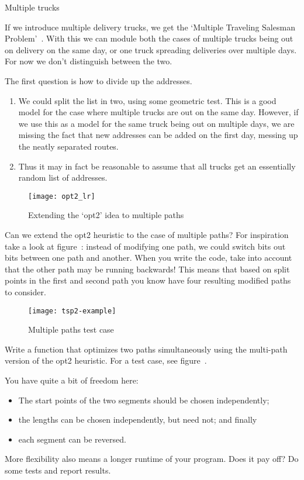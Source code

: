  {Multiple trucks}
\label{sec:amazon-days}

If we introduce multiple delivery trucks, we get the `Multiple
Traveling Salesman Problem'~\cite{Bektas:MTSP}.
With this we can module both the cases of multiple trucks being out on
delivery on the same day, or one truck spreading deliveries over
multiple days. For now we don't distinguish between the two.

The first question is how to divide up the addresses.
\begin{enumerate}
\item We could split the list in two, using some geometric test. This
  is a good model for the case where multiple trucks are out on the
  same day. However, if we use this as a model for the same truck
  being out on multiple days, we are missing the fact that new
  addresses can be added on the first day, messing up the neatly
  separated routes.
\item Thus it may in fact be reasonable to assume that all trucks get
  an essentially random list of addresses.
\end{enumerate}

\begin{figure}[ht]
  \texttt{[image: opt2\_lr]}
  \caption{Extending the `opt2' idea to multiple paths}
  \label{fig:opt2_lr}
\end{figure}

Can we extend the opt2 heuristic to the case of multiple paths?
For inspiration take a look at figure~: instead of
modifying one path, we could switch bits out bits between one path and another.
When you write the code, take into account that the other path may be
running backwards! This means that based on split points in the first
and second path you know have four resulting modified paths to
consider.

\begin{figure}[ht]
  \texttt{[image: tsp2-example]}
  \caption{Multiple paths test case}
  \label{fig:tsp2-example}
\end{figure}

\begin{exercise}
  Write a function that optimizes two paths simultaneously using the
  multi-path version of the opt2 heuristic. For a test case, see
  figure~.

  You have quite a bit of freedom here:
  \begin{itemize}
  \item The start points of the two segments should be chosen independently;
  \item the lengths can be chosen independently, but need not; and finally
  \item each segment can be reversed.
  \end{itemize}
  More flexibility also means a longer runtime of your program.
  Does it pay off? Do some tests and report results.
\end{exercise}

